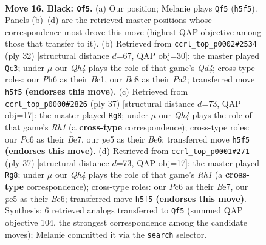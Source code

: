 \documentclass[11pt]{article}
\begin{document}
\clearpage

\begin{figure}[p]\centering
\begin{subfigure}{0.46\textwidth}\centering
\resizebox{\linewidth}{!}{%
\newchessgame
\chessboard[
  setfen={1rb1k2r/p1pp1pp1/2p4p/4P2q/8/P3Q3/P1P1B3/R2KR3 b k - 3 16},
  showmover=false,
  pgfstyle=straightmove, color=movearrow, markmove={h5-f5}
]}
\caption{}
\end{subfigure}\hfill
\begin{subfigure}{0.46\textwidth}\centering
\resizebox{\linewidth}{!}{%
\newchessgame
\chessboard[
  setfen={3qr1k1/1Rp2pp1/r7/p2pPb2/3Q1P2/8/P1P3PP/2B2RK1 w - - 1 17},
  showmover=false,
  pgfstyle=straightmove, color=movearrow, markmove={d4-c3}
]}
\caption{}
\end{subfigure}
\\[4pt]
\begin{subfigure}{0.46\textwidth}\centering
\resizebox{\linewidth}{!}{%
\newchessgame
\chessboard[
  setfen={r3k2r/4bpBp/p2pb3/qp6/8/4Q2P/P3BPP1/R4K1R b kq - 0 19},
  showmover=false,
  pgfstyle=straightmove, color=movearrow, markmove={h8-g8}
]}
\caption{}
\end{subfigure}\hfill
\begin{subfigure}{0.46\textwidth}\centering
\resizebox{\linewidth}{!}{%
\newchessgame
\chessboard[
  setfen={r3k2r/4bpBp/p2pb3/qp6/8/4Q2P/P3BPP1/R4K1R b kq - 0 19},
  showmover=false,
  pgfstyle=straightmove, color=movearrow, markmove={h8-g8}
]}
\caption{}
\end{subfigure}
\caption{\textbf{Move 16, Black: \texttt{Qf5}.} (a) Our position; Melanie plays \texttt{Qf5} (\texttt{h5f5}). Panels (b)--(d) are the retrieved master positions whose correspondence most drove this move (highest QAP objective among those that transfer to it). (b) Retrieved from \texttt{ccrl\_top\_p0002\#2534} (ply 32) [structural distance $d$=67, QAP obj=30]: the master played \texttt{Qc3}; under $\mu$ our \emph{Qh4} plays the role of that game's \emph{Qd4}; cross-type roles: our \emph{P}h6 as their \emph{B}c1, our \emph{B}c8 as their \emph{P}a2; transferred move \texttt{h5f5} \textbf{(endorses this move)}. (c) Retrieved from \texttt{ccrl\_top\_p0000\#2826} (ply 37) [structural distance $d$=73, QAP obj=17]: the master played \texttt{Rg8}; under $\mu$ our \emph{Qh4} plays the role of that game's \emph{Rh1} (a \textbf{cross-type} correspondence); cross-type roles: our \emph{P}c6 as their \emph{B}e7, our \emph{p}e5 as their \emph{B}e6; transferred move \texttt{h5f5} \textbf{(endorses this move)}. (d) Retrieved from \texttt{ccrl\_top\_p0001\#271} (ply 37) [structural distance $d$=73, QAP obj=17]: the master played \texttt{Rg8}; under $\mu$ our \emph{Qh4} plays the role of that game's \emph{Rh1} (a \textbf{cross-type} correspondence); cross-type roles: our \emph{P}c6 as their \emph{B}e7, our \emph{p}e5 as their \emph{B}e6; transferred move \texttt{h5f5} \textbf{(endorses this move)}. Synthesis: 6 retrieved analogs transferred to \texttt{Qf5} (summed QAP objective 104, the strongest correspondence among the candidate moves); Melanie committed it via the \texttt{search} selector.}
\label{fig:thought-m31}
\end{figure}
\end{document}

